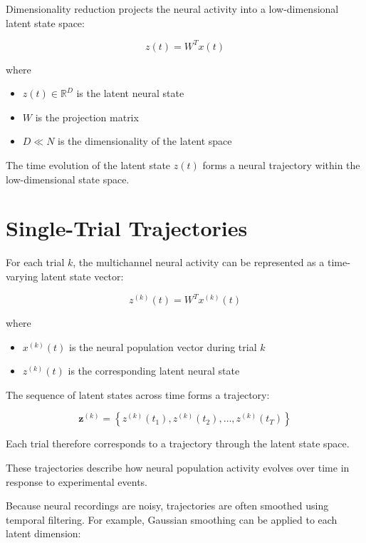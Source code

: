 \documentclass[11pt]{report}
\begin{document}
Dimensionality reduction projects the neural activity into a
low-dimensional latent state space:

\begin{equation}
z(t) = W^{T}x(t)
\end{equation}

where

\begin{itemize}
\item $z(t) \in \mathbb{R}^{D}$ is the latent neural state
\item $W$ is the projection matrix
\item $D \ll N$ is the dimensionality of the latent space
\end{itemize}

The time evolution of the latent state $z(t)$ forms a neural trajectory
within the low-dimensional state space.

\section{Single-Trial Trajectories}

For each trial $k$, the multichannel neural activity can be represented
as a time-varying latent state vector:

\begin{equation}
z^{(k)}(t) = W^{T} x^{(k)}(t)
\end{equation}

where

\begin{itemize}
\item $x^{(k)}(t)$ is the neural population vector during trial $k$
\item $z^{(k)}(t)$ is the corresponding latent neural state
\end{itemize}

The sequence of latent states across time forms a trajectory:

\begin{equation}
\mathbf{z}^{(k)} =
\left\{
z^{(k)}(t_1),
z^{(k)}(t_2),
\dots,
z^{(k)}(t_T)
\right\}
\end{equation}

Each trial therefore corresponds to a trajectory through the latent
state space.

These trajectories describe how neural population activity evolves
over time in response to experimental events.

Because neural recordings are noisy, trajectories are often smoothed
using temporal filtering. For example, Gaussian smoothing can be
applied to each latent dimension:
\end{document}
